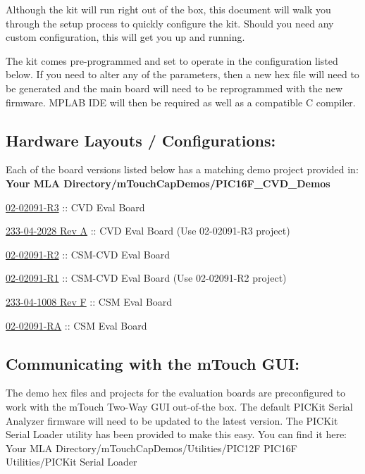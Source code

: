 Although the kit will run right out of the box, this document will walk you through the setup process to quickly configure the kit. Should you need any custom configuration, this will get you up and running.

The kit comes pre-\/programmed and set to operate in the configuration listed below. If you need to alter any of the parameters, then a new hex file will need to be generated and the main board will need to be reprogrammed with the new firmware. M\+P\+L\+A\+B I\+D\+E will then be required as well as a compatible C compiler.\hypertarget{_getting_started_eval_GSE_LAYOUTS}{}\subsection{Hardware Layouts / Configurations\+:}\label{_getting_started_eval_GSE_LAYOUTS}
Each of the board versions listed below has a matching demo project provided in\+: {\bfseries {\ttfamily Your M\+L\+A Directory/m\+Touch\+Cap\+Demos/\+P\+I\+C16\+F\+\_\+\+C\+V\+D\+\_\+\+Demos}}

\begin{DoxyItemize}
\item \hyperlink{GSE_R3}{02-\/02091-\/\+R3} \+:\+: C\+V\+D Eval Board \item \hyperlink{GSE_R3}{233-\/04-\/2028 Rev A} \+:\+: C\+V\+D Eval Board (Use 02-\/02091-\/\+R3 project) \item \hyperlink{GSE_R2}{02-\/02091-\/\+R2} \+:\+: C\+S\+M-\/\+C\+V\+D Eval Board \item \hyperlink{GSE_R2}{02-\/02091-\/\+R1} \+:\+: C\+S\+M-\/\+C\+V\+D Eval Board (Use 02-\/02091-\/\+R2 project) \item \hyperlink{GSE_RF}{233-\/04-\/1008 Rev F} \+:\+: C\+S\+M Eval Board \item \hyperlink{GSE_RA}{02-\/02091-\/\+R\+A} \+:\+: C\+S\+M Eval Board\end{DoxyItemize}
\hypertarget{_getting_started_eval_GSE_GUI}{}\subsection{Communicating with the m\+Touch G\+U\+I\+:}\label{_getting_started_eval_GSE_GUI}
The demo hex files and projects for the evaluation boards are preconfigured to work with the m\+Touch Two-\/\+Way G\+U\+I out-\/of-\/the box. The default P\+I\+C\+Kit Serial Analyzer firmware will need to be updated to the latest version. The P\+I\+C\+Kit Serial Loader utility has been provided to make this easy. You can find it here\+: {\ttfamily Your M\+L\+A Directory/m\+Touch\+Cap\+Demos/\+Utilities/\+P\+I\+C12\+F P\+I\+C16\+F Utilities/\+P\+I\+C\+Kit Serial Loader}

